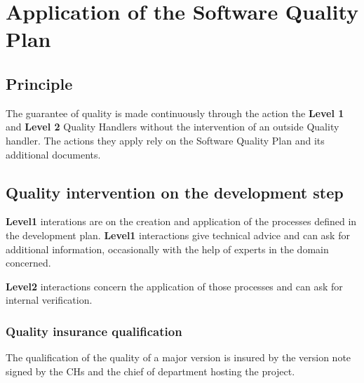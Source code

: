 \chapter{Application of the Software Quality Plan}

\section{Principle}

The guarantee of quality is made continuously through the action the
\textbf{Level 1} and \textbf{Level 2} Quality Handlers without the intervention
of an outside Quality handler. The actions they apply rely on the Software
Quality Plan and its additional documents.

\section{Quality intervention on the development step}

\textbf{Level1} interations are on the creation and application of the
processes defined in the development plan. \textbf{Level1} interactions give
technical advice and can ask for additional information, occasionally with the
help of experts in the domain concerned.

\textbf{Level2} interactions concern the application of those processes and can
ask for internal verification.

\subsection{Quality insurance qualification}

The qualification of the quality of a major version is insured by the version
note signed by the CHs and the chief of department hosting the \telemacsystem project.
